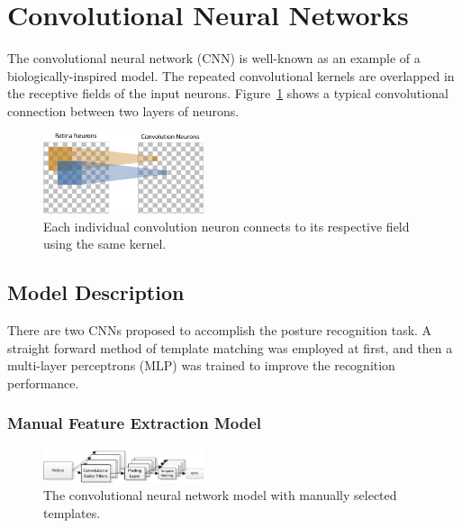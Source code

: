 \documentclass[journal]{journal}
\begin{document}
\section{Convolutional Neural Networks}
\label{sec:cnn}
The convolutional neural network (CNN) is well-known as an example of a biologically-inspired model. 
The repeated convolutional kernels are overlapped in the receptive fields of the input neurons. 
Figure~\ref{fig:conv} shows a typical convolutional connection between two layers of neurons. 

\begin{figure}
\centering
	\includegraphics[width=0.42\textwidth]{pics/convolution.png}
	\caption{Each individual convolution neuron connects to its respective field using the same kernel.}
	\label{fig:conv}
\end{figure}

\subsection{Model Description}
\label{sec:mds}
There are two CNNs proposed to accomplish the posture recognition task.
A straight forward method of template matching was employed at first, and then a multi-layer perceptrons (MLP) was trained to improve the recognition performance.
\subsubsection{Manual Feature Extraction Model}

\begin{figure}
\centering
	\includegraphics[width=0.42\textwidth]{pics/model1.pdf}
	\caption{The convolutional neural network model with manually selected templates.}
	\label{fig:model1}
\end{figure}
\end{document}
